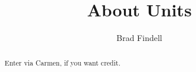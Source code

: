 \documentclass[handout,space,nooutcomes]{xourse}
\title{About Units}
\author{Brad Findell}
\begin{document}
\begin{abstract}
Enter via Carmen, if you want credit.  
\end{abstract}
\maketitle

{}
\end{document}
